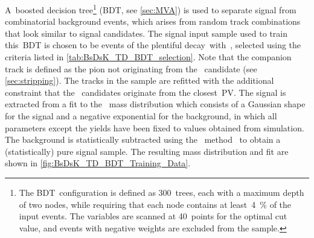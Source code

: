 A~boosted decision tree\footnote{
    The BDT~configuration is defined as \num{300}~trees, each with a maximum depth of two nodes, while requiring that each node contains at least~\SI{4}{\percent} of the input events.
    The variables are scanned at \num{40}~points for the optimal cut value, and events with negative weights are excluded from the sample.}
(BDT, see \cref{sec:MVA}) is used to separate signal from combinatorial background events, which arises from random track combinations that look similar to signal candidates.
The signal input sample used to train this~BDT is chosen to be events of the plentiful decay~\BsDsPi with~\DsmKKPi, selected using the criteria listed in \cref{tab:BsDsK_TD_BDT_selection}.
Note that the companion track is defined as the pion not originating from the \Dsm~candidate (see \cref{sec:stripping}).
The tracks in the sample are refitted with the additional constraint that the \Bs~candidates originate from the closest~PV.
The signal is extracted from a fit to the \DsmPip~mass distribution which consists of a Gaussian shape for the signal and a negative exponential for the background, in which all parameters except the yields have been fixed to values obtained from simulation.
The background is statistically subtracted using the \sfit~method~\cite{Yuehong_sFit} to obtain a (statistically) pure signal sample.
The resulting mass distribution and fit are shown in \cref{fig:BsDsK_TD_BDT_Training_Data}.


